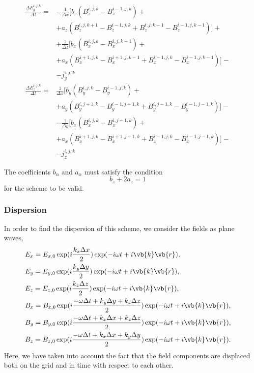 \documentclass[12pt,a4paper,DIV=calc]{scrartcl}
\begin{document}
\begin{align}
    \frac{\Delta E_y^{i,j,k}}{\Delta t} = &-\frac{1}{\Delta x}\big[b_z\left(B_z^{i,j,k} - B_z^{i-1,j,k}\right) + \nonumber \\
    &+ a_z \left(B_z^{i,j,k+1} - B_z^{i-1,j,k} + B_z^{i,j,k-1} - B_z^{i-1,j,k-1}\right)\big] + \nonumber \\
    &+ \frac{1}{\Delta z}\big[ b_x \left(B_x^{i,j,k} - B_x^{i,j,k-1}\right) + \nonumber \\
    &+ a_x\left(B_x^{i+1,j,k} - B_x^{i+1,j,k-1} + B_x^{i-1,j,k} - B_x^{i-1,j,k-1}\right)\big] - \nonumber \\
    &- j_y^{i,j,k}
\end{align}
\begin{align}
    \frac{\Delta E_z^{i,j,k}}{\Delta t} = &\frac{1}{\Delta x}\big[b_y\left(B_y^{i,j,k} - B_y^{i-1,j,k}\right) + \nonumber \\
    &+ a_y \left(B_y^{i,j+1,k} -B_y^{i-1,j+1,k} + B_y^{i,j-1,k} - B_y^{i-1,j-1,k} \right)\big] - \nonumber \\
    &- \frac{1}{\Delta y}\big[ b_x\left(B_x^{i,j,k} - B_x^{i,j-1,k}\right) + \nonumber \\
    &+ a_x \left(B_x^{i+1,j,k} - B_x^{i+1,j-1,k} + B_x^{i-1,j,k} - B_x^{i-1,j-1,k} \right)\big] - \nonumber \\
    &- j_z^{i,j,k}
\end{align}

The coefficients $b_\alpha$ and $a_\alpha$ must satisfy the condition 
\begin{equation}
b_z + 2 a_z = 1
\end{equation}
for the scheme to be valid.

\subsubsection{Dispersion}
\label{sec:maxwell:ndfx:dispersion}

In order to find the dispersion of this scheme, we consider the fields as plane waves,
\begin{align}
    &E_x = E_{x,0} \exp(i \frac{k_x \Delta x}{2}) \exp(-i \omega t + i \vb{k} \vb{r}),\\
    &E_y = E_{y,0} \exp(i \frac{k_y \Delta y}{2}) \exp(-i \omega t + i \vb{k} \vb{r}),\\
    &E_z = E_{z,0} \exp(i \frac{k_z \Delta z}{2}) \exp(-i \omega t + i \vb{k} \vb{r}),\\
    &B_x = B_{x,0} \exp(i \frac{-\omega \Delta t + k_y \Delta y + k_z \Delta z}{2}) \exp(-i \omega t + i \vb{k} \vb{r}),\\
    &B_y = B_{y,0} \exp(i \frac{-\omega \Delta t + k_x \Delta x + k_z \Delta z}{2}) \exp(-i \omega t + i \vb{k} \vb{r}),\\
    &B_z = B_{z,0} \exp(i \frac{-\omega \Delta t + k_x \Delta x + k_y \Delta y}{2}) \exp(-i \omega t + i \vb{k} \vb{r}).
\end{align}
Here, we have taken into account the fact that the field components are displaced both on the grid and in time with respect to each other.
\end{document}

